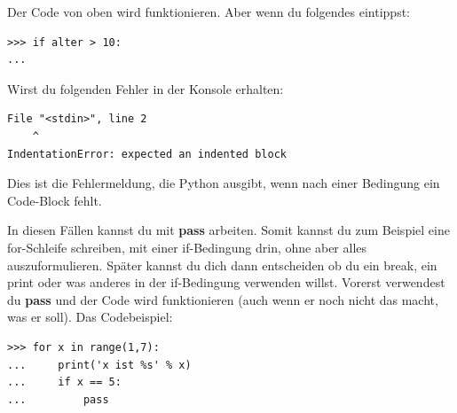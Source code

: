 \noindent
Der Code von oben wird funktionieren. Aber wenn du folgendes eintippst:

\begin{Verbatim}[frame=single]
>>> if alter > 10:
...
\end{Verbatim}

\noindent
Wirst du folgenden Fehler in der Konsole erhalten:

\begin{Verbatim}[frame=single]
  File "<stdin>", line 2
    ^
IndentationError: expected an indented block
\end{Verbatim}

Dies ist die Fehlermeldung, die Python ausgibt, wenn nach einer Bedingung ein Code-Block fehlt.
\par
In diesen Fällen kannst du mit \textbf{pass} arbeiten. Somit kannst du zum Beispiel eine for-Schleife schreiben, mit einer if-Bedingung drin, ohne aber alles auszuformulieren. Später kannst du dich dann entscheiden ob du ein break, ein print oder was anderes in der if-Bedingung verwenden willst. Vorerst verwendest du \textbf{pass} und der Code wird funktionieren (auch wenn er noch nicht das macht, was er soll). Das Codebeispiel:

\begin{Verbatim}[frame=single]
>>> for x in range(1,7):
...     print('x ist %s' % x)
...     if x == 5:
...         pass
\end{Verbatim}

